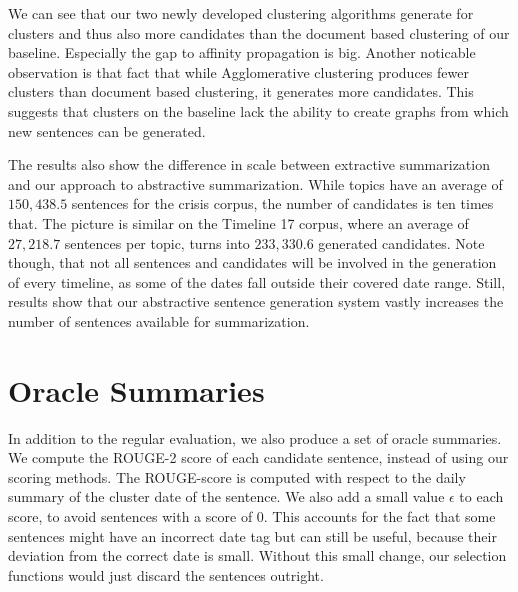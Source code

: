 \documentclass[a4paper,BCOR=10mm]{report}
\numberwithin{lemma}{chapter}
\numberwithin{definition}{chapter}
\begin{document}
We can see that our two newly developed clustering algorithms generate for clusters and thus also more candidates than the document based clustering of our baseline. Especially the gap to affinity propagation is big.
Another noticable observation is that fact that while Agglomerative clustering produces fewer clusters than document based clustering, it generates more candidates. This suggests that clusters on the baseline lack the ability to create graphs from which new sentences can be generated.

The results also show the difference in scale between extractive summarization and our approach to abstractive summarization.
While topics have an average of $150,438.5$ sentences for the crisis corpus, the number of candidates is ten times that.
The picture is similar on the Timeline 17 corpus, where an average of $27,218.7$ sentences per topic, turns into $233,330.6$ generated candidates. Note though, that not all sentences and candidates will be involved in the generation of every timeline, as some of the dates fall outside their covered date range.
Still, results show that our abstractive sentence generation system vastly increases the number of sentences available for summarization.


%
%

\section{Oracle Summaries}

In addition to the regular evaluation, we also produce a set of oracle summaries. We compute the ROUGE-2 score of each candidate sentence, instead of using our scoring methods. The ROUGE-score is computed with respect to the daily summary of the cluster date of the sentence. We also add a small value $\epsilon$ to each score, to avoid sentences with a score of 0. This accounts for the fact that some sentences might have an incorrect date tag but can still be useful, because their deviation from the correct date is small. Without this small change, our selection functions would just discard the sentences outright.
\end{document}
